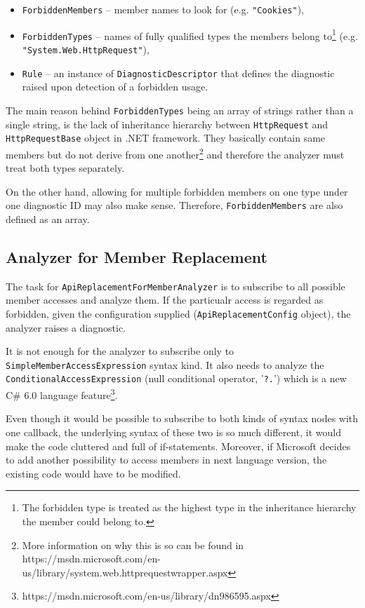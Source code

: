 \documentclass[
  digital, %
  table,   %
  lof,     %
  lot,     %
  oneside,
]{fithesis3}
\begin{document}
\begin{itemize}
  \item \texttt{ForbiddenMembers} -- member names to look for (e.g. \texttt{"Cookies"}), 
  \item \texttt{ForbiddenTypes} -- names of fully qualified types the members belong to\footnote{The forbidden type is treated as the highest type in the inheritance hierarchy the member could belong to.
} (e.g. \texttt{"System.Web.HttpRequest"}), 
  \item \texttt{Rule} -- an instance of \texttt{DiagnosticDescriptor} that defines the diagnostic raised upon detection of a forbidden usage.
\end{itemize} 

The main reason behind \texttt{ForbiddenTypes} being an array of strings rather than a single string, is the lack of inheritance hierarchy between \texttt{HttpRequest} and \texttt{HttpRequestBase} object in .NET framework. They basically contain same members but do not derive from one another\footnote{More information on why this is so can be found in https://msdn.microsoft.com/en-us/library/system.web.httprequestwrapper.aspx} and therefore the analyzer must treat both types separately. 

On the other hand, allowing for multiple forbidden members on one type under one diagnostic ID may also make sense. Therefore, \texttt{ForbiddenMembers} are also defined as an array.

\subsection{Analyzer for Member Replacement}
The task for \texttt{ApiReplacementForMemberAnalyzer} is to subscribe to all possible member accesses and analyze them. If the particualr access is regarded as forbidden, given the configuration supplied (\texttt{ApiReplacementConfig} object), the analyzer raises a diagnostic.

It is not enough for the analyzer to subscribe only to \texttt{SimpleMemberAccessExpression} syntax kind. It also needs to analyze the \texttt{ConditionalAccessExpression} (null conditional operator, '\texttt{?.}') which is a new C\# 6.0 language feature\footnote{https://msdn.microsoft.com/en-us/library/dn986595.aspx}. 

Even though it would be possible to subscribe to both kinds of syntax nodes with one callback, the underlying syntax of these two is so much different, it would make the code cluttered and full of if-statements. Moreover, if Microsoft decides to add another possibility to access members in next language version, the existing code would have to be modified.
\end{document}
